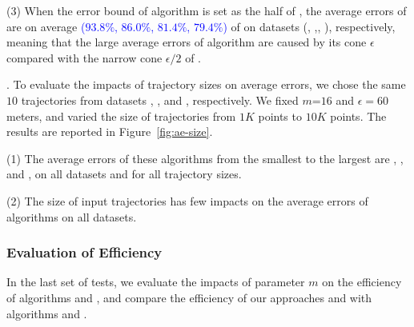 \ni(3) When the error bound of algorithm \cista is set as the half of \cist, the
average errors of \cista are on average \textcolor{blue}{($93.8\%$, $86.0\%$, $81.4\%$, {$79.4\%$})} of \cist on {datasets} (\sercar, \geolife,\mopsi, \pricar), respectively, meaning that the large average errors of algorithm \cista are caused by its cone \wrt $\epsilon$ compared with the narrow cone \wrt $\epsilon/2$ of \cist.


.
To evaluate the impacts of trajectory sizes on average errors, we chose the same
{$10$} trajectories from  {datasets}  \sercar, \geolife, \mopsi and \pricar, respectively.
We fixed {$m$=$16$} and $\epsilon = 60$ meters, and varied the size  of trajectories from $1K$ points to $10K$ points.
%
The results are reported in Figure~\ref{fig:ae-size}.

\ni(1) The average errors of these algorithms from the smallest to the largest are \squishe, \dps, \cist and \cista, on all datasets and for all trajectory sizes. %

\ni(2) The size of input trajectories has few impacts on the average errors of \lsa algorithms on all datasets.




\subsubsection{Evaluation of Efficiency}


In the last set of tests, we evaluate the impacts of parameter $m$ on the efficiency of algorithms \cist and \cista, and compare the efficiency of our approaches \cist and \cista with algorithms \dps and \squishe.
%


